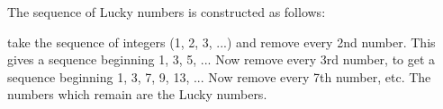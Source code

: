 The sequence of Lucky numbers is constructed as follows:
\par
take the sequence of integers (1, 2, 3, ...) and remove
every 2nd number. This gives a sequence beginning
1, 3, 5, ... Now remove every 3rd number, to get a sequence
beginning 1, 3, 7, 9, 13, ... Now remove every 7th number, etc.
The numbers which remain are the Lucky numbers.
